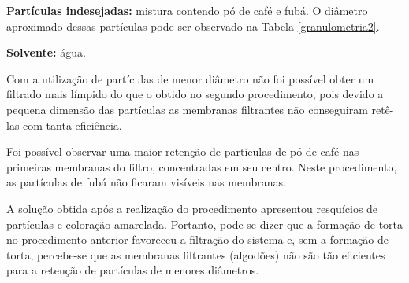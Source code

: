 \textbf{Partículas indesejadas:} mistura contendo pó de café e fubá. O
diâmetro aproximado dessas partículas pode ser observado na Tabela
\ref{granulometria2}.

\textbf{Solvente:} água.

Com a utilização de partículas de menor diâmetro não foi possível obter um
filtrado mais límpido do que o obtido no segundo procedimento, pois devido a
pequena dimensão das partículas as membranas filtrantes não conseguiram retê-las
com tanta eficiência.

Foi possível observar uma maior retenção de partículas de pó de café nas
primeiras membranas do filtro, concentradas em seu centro. Neste procedimento,
as partículas de fubá não ficaram visíveis nas membranas.

A solução obtida após a realização do procedimento apresentou resquícios de
partículas e coloração amarelada. Portanto, pode-se dizer que a formação de
torta no procedimento anterior favoreceu a filtração do sistema e, sem a
formação de torta, percebe-se que as membranas filtrantes (algodões) não são tão
eficientes para a retenção de partículas de menores diâmetros.



